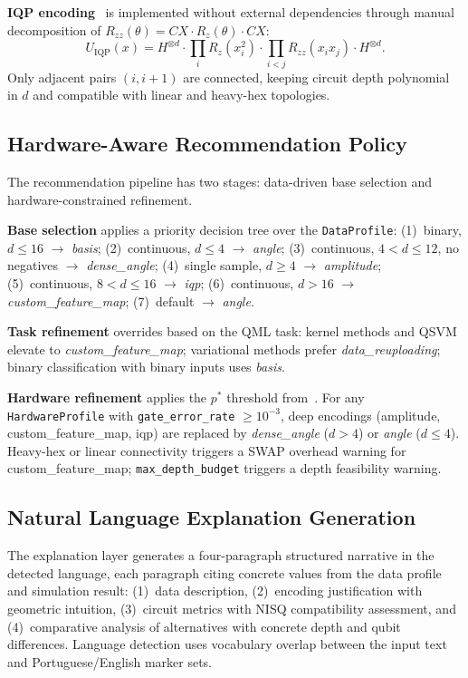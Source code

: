 \documentclass[sigconf,nonacm]{acmart}
\begin{document}
\textbf{IQP encoding}~\cite{havlicek2019} is implemented without external
dependencies through manual decomposition of $R_{zz}(\theta) = CX{\cdot}R_z(\theta){\cdot}CX$:
\begin{equation}
  U_{\mathrm{IQP}}(x)
  = H^{\otimes d}
    \cdot \prod_i R_z(x_i^2)
    \cdot \prod_{i<j} R_{zz}(x_i x_j)
    \cdot H^{\otimes d}.
\end{equation}
Only adjacent pairs $(i, i{+}1)$ are connected, keeping circuit depth polynomial in
$d$ and compatible with linear and heavy-hex topologies.

\subsection{Hardware-Aware Recommendation Policy}

The recommendation pipeline has two stages: data-driven base selection and
hardware-constrained refinement.

\textbf{Base selection} applies a priority decision tree over the \texttt{DataProfile}:
(1)~binary, $d \leq 16$ $\to$ \textit{basis};
(2)~continuous, $d \leq 4$ $\to$ \textit{angle};
(3)~continuous, $4 < d \leq 12$, no negatives $\to$ \textit{dense\_angle};
(4)~single sample, $d \geq 4$ $\to$ \textit{amplitude};
(5)~continuous, $8 < d \leq 16$ $\to$ \textit{iqp};
(6)~continuous, $d > 16$ $\to$ \textit{custom\_feature\_map};
(7)~default $\to$ \textit{angle}.

\textbf{Task refinement} overrides based on the QML task: kernel methods and QSVM
elevate to \textit{custom\_feature\_map}; variational methods prefer
\textit{data\_reuploading}; binary classification with binary inputs uses \textit{basis}.

\textbf{Hardware refinement} applies the $p^{*}$ threshold
from~\cite{sammartino2026}. For any \texttt{HardwareProfile} with
\texttt{gate\_error\_rate} $\geq 10^{-3}$, deep encodings (amplitude,
custom\_feature\_map, iqp) are replaced by \textit{dense\_angle} ($d > 4$) or
\textit{angle} ($d \leq 4$). Heavy-hex or linear connectivity triggers a SWAP
overhead warning for custom\_feature\_map; \texttt{max\_depth\_budget} triggers
a depth feasibility warning.

\subsection{Natural Language Explanation Generation}

The explanation layer generates a four-paragraph structured narrative in the
detected language, each paragraph citing concrete values from the data profile and
simulation result: (1)~data description, (2)~encoding justification with geometric
intuition, (3)~circuit metrics with NISQ compatibility assessment, and
(4)~comparative analysis of alternatives with concrete depth and qubit differences.
Language detection uses vocabulary overlap between the input text and
Portuguese/English marker sets.
\end{document}
